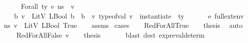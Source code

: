 \begin{isabellebody}
\ \ \ {\isachardoublequoteopen}{\isasymLambda}{\isacharcomma}{\kern0pt}{\isasymGamma}{\isacharcomma}{\kern0pt}{\isasymOmega}\ {\isasymturnstile}\ {\isasymlangle}Forall\ ty\ e{\isacharcomma}{\kern0pt}\ n{\isacharunderscore}{\kern0pt}s{\isasymrangle}\ {\isasymDown}\ v{\isachardoublequoteclose}\isanewline
\ \ \ {\isachardoublequoteopen}{\isasymexists}b{\isachardot}{\kern0pt}\ {\isacharparenleft}{\kern0pt}v\ {\isacharequal}{\kern0pt}\ LitV\ {\isacharparenleft}{\kern0pt}LBool\ b{\isacharparenright}{\kern0pt}{\isacharparenright}{\kern0pt}\ {\isasymand}\ {\isacharparenleft}{\kern0pt}b\ {\isacharequal}{\kern0pt}\ {\isacharparenleft}{\kern0pt}{\isasymforall}v{\isacharprime}{\kern0pt}{\isachardot}{\kern0pt}\ type{\isacharunderscore}{\kern0pt}of{\isacharunderscore}{\kern0pt}val\ v{\isacharprime}{\kern0pt}\ {\isacharequal}{\kern0pt}\ {\isacharparenleft}{\kern0pt}instantiate\ {\isasymOmega}\ ty{\isacharparenright}{\kern0pt}\ {\isasymlongrightarrow}\ \ {\isasymLambda}{\isacharcomma}{\kern0pt}\ {\isasymGamma}{\isacharcomma}{\kern0pt}\ {\isasymOmega}\ {\isasymturnstile}\ {\isasymlangle}e{\isacharcomma}{\kern0pt}\ full{\isacharunderscore}{\kern0pt}ext{\isacharunderscore}{\kern0pt}env\ n{\isacharunderscore}{\kern0pt}s\ v{\isacharprime}{\kern0pt}{\isasymrangle}\ {\isasymDown}\ LitV\ {\isacharparenleft}{\kern0pt}LBool\ True{\isacharparenright}{\kern0pt}{\isacharparenright}{\kern0pt}{\isacharparenright}{\kern0pt}{\isachardoublequoteclose}\isanewline
%
\isadelimproof
\ \ %
\endisadelimproof
%
\isatagproof
{}\isamarkupfalse%
\ assms\isanewline
{}\isamarkupfalse%
\ {\isacharparenleft}{\kern0pt}cases{\isacharparenright}{\kern0pt}\isanewline
\ \ \isamarkupfalse%
\ RedForAllTrue\isanewline
\ \ \isamarkupfalse%
\ {\isacharquery}{\kern0pt}thesis\ \isamarkupfalse%
\ auto\isanewline
{}\isamarkupfalse%
\isanewline
\ \ \isamarkupfalse%
\ {\isacharparenleft}{\kern0pt}RedForAllFalse\ v{\isacharprime}{\kern0pt}{\isacharparenright}{\kern0pt}\isanewline
\ \ \isamarkupfalse%
\ {\isacharquery}{\kern0pt}thesis\ \isanewline
\ \ \ \ \isamarkupfalse%
\ {\isacharparenleft}{\kern0pt}blast\ dest{\isacharcolon}{\kern0pt}\ expr{\isacharunderscore}{\kern0pt}eval{\isacharunderscore}{\kern0pt}determ{\isacharparenleft}{\kern0pt}{}{\isacharparenright}{\kern0pt}{\isacharparenright}{\kern0pt}\isanewline
{}\isamarkupfalse%
%
\endisatagproof
{\isafoldproof}%
%
\isadelimproof

\end{isabellebody}
